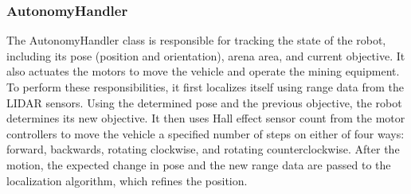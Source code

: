 \subsubsection{AutonomyHandler}
The AutonomyHandler class is responsible for tracking the state of the robot, including its pose (position and orientation), arena area, and current objective.  It also actuates the motors to move the vehicle and operate the mining equipment.  To perform these responsibilities, it first localizes itself using range data from the LIDAR sensors.  Using the determined pose and the previous objective, the robot determines its new objective.  It then uses Hall effect sensor count from the motor controllers to move the vehicle a specified number of steps on either of four ways: forward, backwards, rotating clockwise, and rotating counterclockwise.  After the motion, the expected change in pose and the new range data are passed to the localization algorithm, which refines the position.
